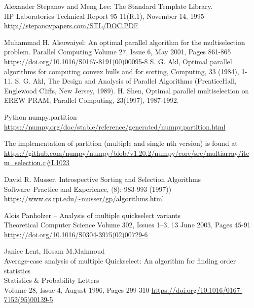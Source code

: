 \renewcommand{\addcontentsline}[3]{}%
\begin{thebibliography}{9}

Alexander Stepanov and Meng Lee: The Standard Template Library.\\HP Laboratories Technical Report 95-11(R.1), November 14, 1995 \\
\url{http://stepanovpapers.com/STL/DOC.PDF }

Muhammad H. Alsuwaiyel: An optimal parallel algorithm for the multiselection problem. 
Parallel Computing Volume 27, Issue 6, May 2001, Pages 861-865\\
\url{https://doi.org/10.1016/S0167-8191(00)00095-8 }
S. G. Akl, Optimal parallel algorithms for computing convex hulls and for sorting, Computing, 33 (1984), 1-11.
S. G. Akl, The Design and Analysis of Parallel Algorithms (PrenticeHall, Englewood Cliffs, New Jersey, 1989).
H. Shen, Optimal parallel multiselection on EREW PRAM, Parallel Computing, 23(1997), 1987-1992.

Python numpy.partition \\
\url{https://numpy.org/doc/stable/reference/generated/numpy.partition.html }

The implementation of partition (multiple and single nth version) is found at
{\footnotesize \url{https://github.com/numpy/numpy/blob/v1.20.2/numpy/core/src/multiarray/item_selection.c#L1023 }}

David R. Musser, Introspective Sorting and Selection Algorithms\\
Software--Practice and Experience, (8): 983-993 (1997))\\
\url{https://www.cs.rpi.edu/~musser/gp/algorithms.html }

Alois Panholzer --
Analysis of multiple quickselect variants\\
Theoretical Computer Science
Volume 302, Issues 1–3, 13 June 2003, Pages 45-91\\
\url{https://doi.org/10.1016/S0304-3975(02)00729-6 }

Janice Lent, Hosam M.Mahmoud\\
Average-case analysis of multiple Quickselect: An algorithm for finding order statistics\\
Statistics \& Probability Letters \\
Volume 28, Issue 4, August 1996, Pages 299-310
\url{https://doi.org/10.1016/0167-7152(95)00139-5}

\end{thebibliography}
\let\addcontentsline\oldaddcontentsline%




